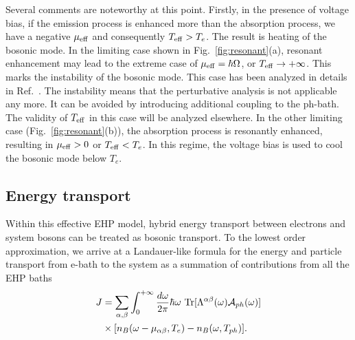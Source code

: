 \documentclass[aps,prb,
,floatfix,footinbib,shortbibliography,
preprint
]{revtex4-1}
\begin{document}
Several comments are noteworthy at this point. Firstly, in the presence of voltage bias, if the emission process is enhanced more than the absorption process, we have a negative $\mu_{\rm eff}$ and consequently $T_{\rm eff}>T_e$. The result is heating of the bosonic mode. In the limiting case shown in Fig.~\ref{fig:resonant}(a), resonant enhancement may lead to the extreme case of $\mu_{\rm eff}=\hbar\Omega$, or $T_{\rm eff}\to +\infty$. This marks the instability of the bosonic mode. This case has been analyzed in details in Ref.~. The instability means that the perturbative analysis is not applicable any more\cite{nitzan2018kinetic}. It can be avoided by introducing additional coupling to the ph-bath. The validity of $T_{\rm eff}$ in this case will be analyzed elsewhere\cite{Wang-preprint}. In the other limiting case (Fig.~\ref{fig:resonant}(b)), the absorption process is resonantly enhanced, resulting in $\mu_{\rm eff}>0$ or $T_{\rm eff}<T_{e}$. In this regime, the voltage bias is used to cool the bosonic mode below $T_e$.



\subsection{Energy transport}
Within this effective EHP model, hybrid energy transport between  electrons and system bosons can be treated as bosonic transport.
To the lowest order approximation, we arrive at a  Landauer-like formula for the energy and particle transport from e-bath to the system as a summation of contributions from all the EHP baths
\begin{align}
J &= \sum_{\alpha,\beta}\int_0^{+\infty}\frac{d\omega}{2\pi}\hbar\omega\ {\rm Tr}[\Lambda^{\alpha\beta}(\omega)\mathcal{A}_{ph}(\omega)]\nonumber\\
&\times [n_B(\omega-\mu_{\alpha\beta},{T}_{e})-n_B(\omega,T_{ph})].
\label{eq:jjtrans}
\end{align}
\end{document}
